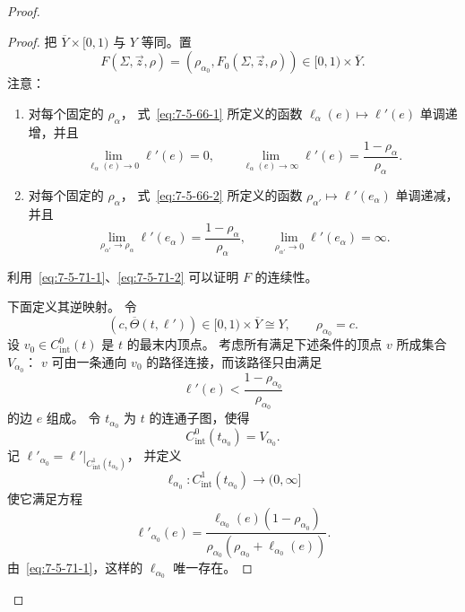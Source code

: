 \begin{proof}
\begin{proof}
把 $\overline Y\times[0,1)$ 与 $Y$ 等同。置
\[
F(\Sigma,\vec z,\rho)
=(\rho_{\alpha_0},F_0(\Sigma,\vec z,\rho))
\in[0,1)\times\overline Y.
\]
注意：
\begin{enumerate}[label=\textup{(7.5.71.\arabic*)},leftmargin=6em]
\item\label{eq:7-5-71-1}
对每个固定的 $\rho_\alpha$，
式~\eqref{eq:7-5-66-1} 所定义的函数
$\ell_\alpha(e)\mapsto\ell'(e)$ 单调递增，并且
\[
\lim_{\ell_\alpha(e)\to0}\ell'(e)=0,
\qquad
\lim_{\ell_\alpha(e)\to\infty}\ell'(e)
=\frac{1-\rho_\alpha}{\rho_\alpha}.
\]
\item\label{eq:7-5-71-2}
对每个固定的 $\rho_\alpha$，
式~\eqref{eq:7-5-66-2} 所定义的函数
$\rho_{\alpha'}\mapsto\ell'(e_\alpha)$ 单调递减，并且
\[
\lim_{\rho_{\alpha'}\to\rho_\alpha}\ell'(e_\alpha)
=\frac{1-\rho_\alpha}{\rho_\alpha},
\qquad
\lim_{\rho_{\alpha'}\to0}\ell'(e_\alpha)=\infty.
\]
\end{enumerate}
利用~\ref{eq:7-5-71-1}、\ref{eq:7-5-71-2}
可以证明 $F$ 的连续性。

下面定义其逆映射。
令
\[
(c,\overline\Theta(t,\ell'))
\in[0,1)\times\overline Y\cong Y,
\qquad
\rho_{\alpha_0}=c.
\]
设 $v_0\in C^0_{\mathrm{int}}(t)$ 是 $t$ 的最末内顶点。
考虑所有满足下述条件的顶点 $v$ 所成集合 $V_{\alpha_0}$：
$v$ 可由一条通向 $v_0$ 的路径连接，而该路径只由满足
\[
\ell'(e)<\frac{1-\rho_{\alpha_0}}{\rho_{\alpha_0}}
\]
的边 $e$ 组成。
令 $t_{\alpha_0}$ 为 $t$ 的连通子图，使得
\[
C^0_{\mathrm{int}}(t_{\alpha_0})=V_{\alpha_0}.
\]
记
$\ell'_{\alpha_0}
=\ell'|_{C^1_{\mathrm{int}}(t_{\alpha_0})}$，
并定义
\[
\ell_{\alpha_0}\colon
C^1_{\mathrm{int}}(t_{\alpha_0})\longrightarrow(0,\infty]
\]
使它满足方程
\[
\ell'_{\alpha_0}(e)
=\frac{\ell_{\alpha_0}(e)(1-\rho_{\alpha_0})}
{\rho_{\alpha_0}
 (\rho_{\alpha_0}+\ell_{\alpha_0}(e))}.
\]
由~\ref{eq:7-5-71-1}，这样的 $\ell_{\alpha_0}$ 唯一存在。


\end{proof}
\end{proof}
